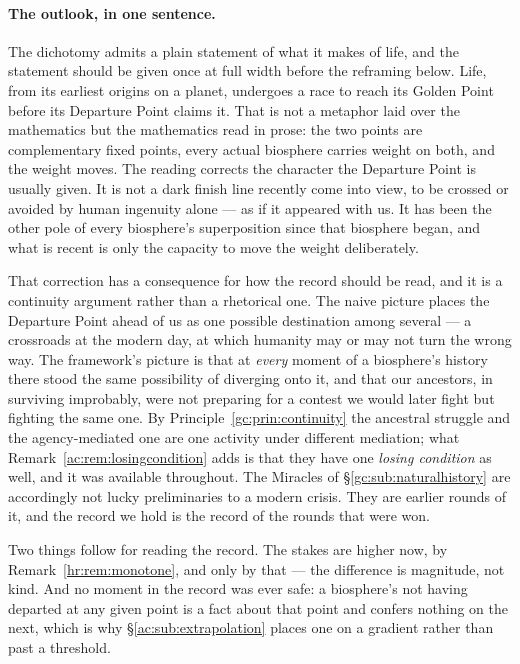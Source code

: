 \documentclass[11pt]{article}
\numberwithin{equation}{section}
\theoremstyle{plain}
\theoremstyle{definition}
\theoremstyle{remark}
\begin{document}
\paragraph{The outlook, in one sentence.}\label{ac:rem:race}
The dichotomy admits a plain statement of what it makes of life, and the
statement should be given once at full width before the reframing below.
Life, from its earliest origins on a planet, undergoes a race to reach
its Golden Point before its Departure Point claims it. That is not a
metaphor laid over the mathematics but the mathematics read in prose:
the two points are complementary fixed points, every actual biosphere
carries weight on both, and the weight moves. The reading corrects the
character the Departure Point is usually given. It is not a dark finish
line recently come into view, to be crossed or avoided by human ingenuity
alone --- as if it appeared with us. It has been the other pole of every
biosphere's superposition since that biosphere began, and what is recent
is only the capacity to move the weight deliberately.

That correction has a consequence for how the record should be read, and
it is a continuity argument rather than a rhetorical one. The naive
picture places the Departure Point ahead of us as one possible
destination among several --- a crossroads at the modern day, at which
humanity may or may not turn the wrong way. The framework's picture is
that at \emph{every} moment of a biosphere's history there stood the
same possibility of diverging onto it, and that our ancestors, in
surviving improbably, were not preparing for a contest we would later
fight but fighting the same one. By
Principle~\ref{gc:prin:continuity} the ancestral struggle and the
agency-mediated one are one activity under different mediation; what
Remark~\ref{ac:rem:losingcondition} adds is that they have one
\emph{losing condition} as well, and it was available throughout. The
Miracles of \S\ref{gc:sub:naturalhistory} are accordingly not
lucky preliminaries to a modern crisis. They are earlier rounds of it,
and the record we hold is the record of the rounds that were won.

Two things follow for reading the record. The stakes are higher now, by
Remark~\ref{hr:rem:monotone}, and only by that --- the difference is
magnitude, not kind. And no moment in the record was ever safe: a
biosphere's not having departed at any given point is a fact about that
point and confers nothing on the next, which is why
\S\ref{ac:sub:extrapolation} places one on a gradient rather than past a
threshold.
\end{document}
